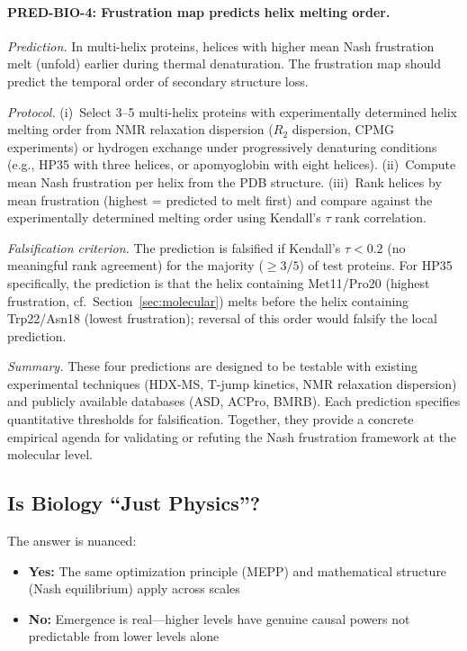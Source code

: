 \documentclass[12pt,a4paper]{article}
\theoremstyle{remark}
\begin{document}
\paragraph{PRED-BIO-4: Frustration map predicts helix melting order.}

\textit{Prediction.}
In multi-helix proteins, helices with higher mean Nash frustration melt (unfold) earlier during thermal denaturation. The frustration map should predict the temporal order of secondary structure loss.

\textit{Protocol.}
(i)~Select 3--5 multi-helix proteins with experimentally determined helix melting order from NMR relaxation dispersion ($R_2$ dispersion, CPMG experiments) or hydrogen exchange under progressively denaturing conditions (e.g., HP35 with three helices, or apomyoglobin with eight helices).
(ii)~Compute mean Nash frustration per helix from the PDB structure.
(iii)~Rank helices by mean frustration (highest = predicted to melt first) and compare against the experimentally determined melting order using Kendall's $\tau$ rank correlation.

\textit{Falsification criterion.}
The prediction is falsified if Kendall's $\tau < 0.2$ (no meaningful rank agreement) for the majority ($\geq 3/5$) of test proteins. For HP35 specifically, the prediction is that the helix containing Met11/Pro20 (highest frustration, cf.\ Section~\ref{sec:molecular}) melts before the helix containing Trp22/Asn18 (lowest frustration); reversal of this order would falsify the local prediction.

\medskip

\noindent\textit{Summary.} These four predictions are designed to be testable with existing experimental techniques (HDX-MS, T-jump kinetics, NMR relaxation dispersion) and publicly available databases (ASD, ACPro, BMRB). Each prediction specifies quantitative thresholds for falsification. Together, they provide a concrete empirical agenda for validating or refuting the Nash frustration framework at the molecular level.

\subsection{Is Biology ``Just Physics''?}

The answer is nuanced:
\begin{itemize}
    \item \textbf{Yes:} The same optimization principle (MEPP) and mathematical structure (Nash equilibrium) apply across scales
    \item \textbf{No:} Emergence is real---higher levels have genuine causal powers not predictable from lower levels alone
\end{itemize}
\end{document}
